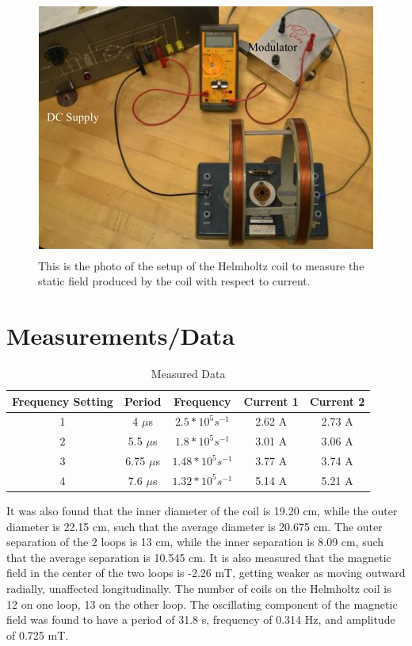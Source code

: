 \documentclass[11pt]{article}
\begin{document}
\begin{figure}[h]
\begin{center}
\includegraphics[scale=1]{lab8.jpg}
\caption{This is the photo of the setup of the Helmholtz coil to measure the static field produced by the coil with respect to current.}
\label{equip}
\end{center}
\end{figure}

\section{Measurements/Data} \label{Measurements}

\begin{table}[htp]
\begin{center}
\begin{tabular}{|c|c|c|c|c|}
\hline
Frequency Setting & Period & Frequency & Current 1 & Current 2\\ \hline
1 & 4 $\mu$s & $2.5 * 10^5 s^{-1}$ & 2.62 A & 2.73 A \\
\hline
2 & 5.5 $\mu$s & $1.8 * 10^5 s^{-1}$ & 3.01 A & 3.06 A \\
\hline
3 & 6.75 $\mu$s & $1.48 * 10^5 s^{-1}$ & 3.77 A & 3.74 A \\
\hline
4 & 7.6 $\mu$s & $1.32 * 10^5 s^{-1}$ & 5.14 A & 5.21 A \\
\hline
\end{tabular}
\caption{Measured Data}
\end{center}
\label{table}
\end{table}

It was also found that the inner diameter of the coil is 19.20 cm, while the outer diameter is 22.15 cm, such that the average diameter is 20.675 cm. The outer separation of the 2 loops is 13 cm, while the inner separation is 8.09 cm, such that the average separation is 10.545 cm. It is also measured that the magnetic field in the center of the two loops is -2.26 mT, getting weaker as moving outward radially, unaffected longitudinally. The number of coils on the Helmholtz coil is 12 on one loop, 13 on the other loop. The oscillating component of the magnetic field was found to have a period of 31.8 s, frequency of 0.314 Hz, and amplitude of 0.725 mT.
\end{document}
